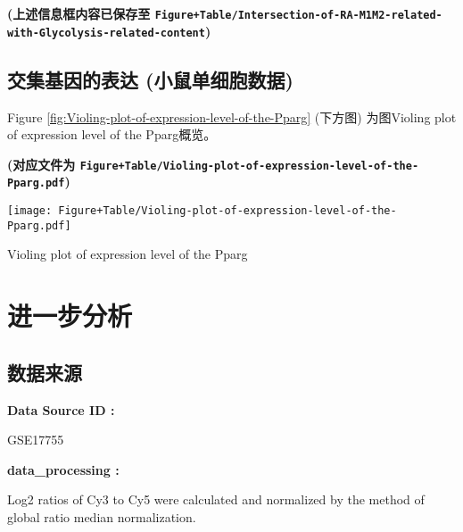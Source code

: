 \documentclass[
]{article}
\begin{document}
\textbf{(上述信息框内容已保存至 \texttt{Figure+Table/Intersection-of-RA-M1M2-related-with-Glycolysis-related-content})}

\hypertarget{ux4ea4ux96c6ux57faux56e0ux7684ux8868ux8fbe-ux5c0fux9f20ux5355ux7ec6ux80deux6570ux636e}{%
\subsection{交集基因的表达 (小鼠单细胞数据)}\label{ux4ea4ux96c6ux57faux56e0ux7684ux8868ux8fbe-ux5c0fux9f20ux5355ux7ec6ux80deux6570ux636e}}

Figure \ref{fig:Violing-plot-of-expression-level-of-the-Pparg} (下方图) 为图Violing plot of expression level of the Pparg概览。

\textbf{(对应文件为 \texttt{Figure+Table/Violing-plot-of-expression-level-of-the-Pparg.pdf})}

\def\@captype{figure}
\begin{center}
\texttt{[image: Figure+Table/Violing-plot-of-expression-level-of-the-Pparg.pdf]}
\caption{Violing plot of expression level of the Pparg}\label{fig:Violing-plot-of-expression-level-of-the-Pparg}
\end{center}

\hypertarget{ux8fdbux4e00ux6b65ux5206ux6790}{%
\section{进一步分析}\label{ux8fdbux4e00ux6b65ux5206ux6790}}

\hypertarget{ux6570ux636eux6765ux6e90-1}{%
\subsection{数据来源}\label{ux6570ux636eux6765ux6e90-1}}

\begin{center}\begin{tcolorbox}[colback=gray!10, colframe=gray!50, width=0.9\linewidth, arc=1mm, boxrule=0.5pt]
\textbf{
Data Source ID
:}

\vspace{0.5em}

    GSE17755

\vspace{2em}


\textbf{
data\_processing
:}

\vspace{0.5em}

    Log2 ratios of Cy3 to Cy5 were calculated and
normalized by the method of global ratio median
normalization.

\vspace{2em}
\end{tcolorbox}
\end{center}
\end{document}

